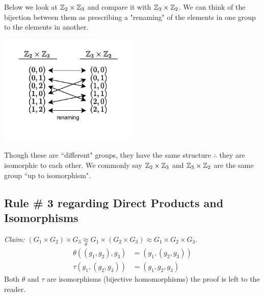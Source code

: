 \begin{example}
Below we look at ${\mathbb{ Z}}_2\times {\mathbb{ Z}}_3$ and compare it with ${\mathbb{ Z}}_3\times {\mathbb{ Z}}_2$. We can think of the bijection between them as prescribing a "renaming" of the elements in one group to the elements in another. \steezybreak\\ 
\begin{center}
    \includegraphics[width=0.5\textwidth]{Figures/IsomorphicDirectProduct1.pdf}
\end{center}
Though these are ``different" groups, they have the same structure $\therefore$ they are isomorphic to each other. We commonly say ${\mathbb{ Z}}_2\times {\mathbb{ Z}}_3$ and ${\mathbb{ Z}}_3\times{\mathbb{ Z}}_2$ are the same group ``up to isomorphism".
\end{example}

\subsection*{Rule \# 3 regarding Direct Products and Isomorphisms}
\textit{Claim:} $(G_1\times G_2)\times G_3 \underset{\theta}{\approx} G_1\times (G_2\times G_3)\approx G_1\times G_2 \times G_3$.
\begin{align}
    \theta((g_1,g_2),g_3)&=(g_1,(g_2,g_3)) \nonumber \\
    \tau(g_1,(g_2,g_3))&=(g_1,g_2,g_3) \nonumber
\end{align}
Both $\theta$ and $\tau$ are isomorphisms (bijective homomorphisms) the proof is left to the reader.

